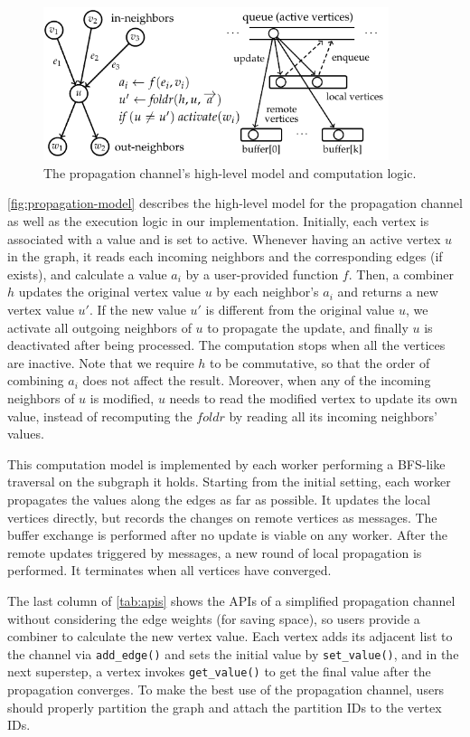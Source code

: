 \documentclass{sokendai_thesis} %
\begin{document}
\begin{figure}[t]
\centering
\includegraphics[width=0.9\textwidth]{figures/async-model.pdf}
\caption{The propagation channel's high-level model and computation logic.}
\label{fig:propagation-model}
\end{figure}

\autoref{fig:propagation-model} describes the high-level model for the propagation channel as well as the execution logic in our implementation.
Initially, each vertex is associated with a value and is set to active.
Whenever having an active vertex $u$ in the graph, it reads each incoming neighbors and the corresponding edges (if exists), and calculate a value $a_i$ by a user-provided function $f$.
Then, a combiner $h$ updates the original vertex value $u$ by each neighbor's $a_i$ and returns a new vertex value $u'$.
If the new value $u'$ is different from the original value $u$, we activate all outgoing neighbors of $u$ to propagate the update, and finally $u$ is deactivated after being processed.
The computation stops when all the vertices are inactive.
Note that we require $h$ to be commutative, so that the order of combining $a_i$ does not affect the result.
Moreover, when any of the incoming neighbors of $u$ is modified, $u$ needs to read the modified vertex to update its own value, instead of recomputing the $\mathit{foldr}$ by reading all its incoming neighbors' values.

This computation model is implemented by each worker performing a BFS-like traversal on the subgraph it holds.
Starting from the initial setting, each worker propagates the values along the edges as far as possible.
It updates the local vertices directly, but records the changes on remote vertices as messages.
The buffer exchange is performed after no update is viable on any worker.
After the remote updates triggered by messages, a new round of local propagation is performed.
It terminates when all vertices have converged.

The last column of \autoref{tab:apis} shows the APIs of a simplified propagation channel without considering the edge weights (for saving space), so users provide a combiner to calculate the new vertex value.
Each vertex adds its adjacent list to the channel via \texttt{add\_edge()} and sets the initial value by \texttt{set\_value()}, and in the next superstep, a vertex invokes \texttt{get\_value()} to get the final value after the propagation converges.
To make the best use of the propagation channel, users should properly partition the graph and attach the partition IDs to the vertex IDs.
\end{document}

